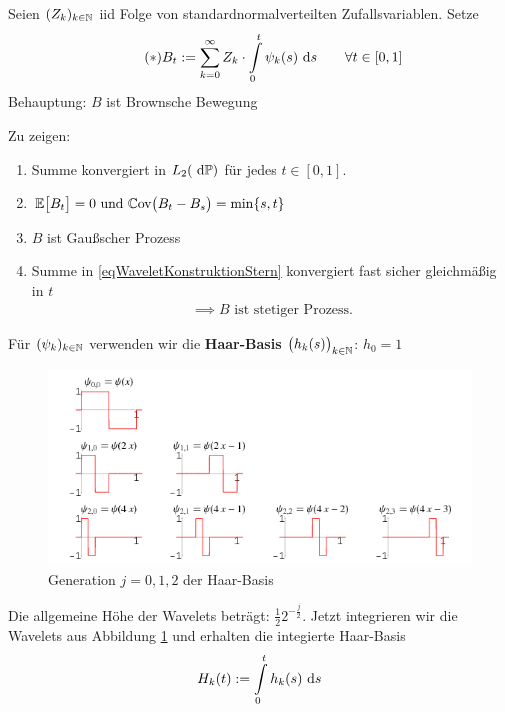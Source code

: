 \begin{theorem}\label{theorem10.2}
	Seien $(Z_k)_{k\in\mathbb{N}}$ iid Folge von standardnormalverteilten Zufallsvariablen. Setze
	\begin{align}\label{eqWaveletKonstruktionStern}\tag{$\ast$}
		B_t:=\sum\limits_{k=0}^\infty Z_k\cdot\int\limits_0^t\psi_k(s)\text{ d} s\qquad\forall t\in[0,1]
	\end{align}
	Behauptung: $B$ ist Brownsche Bewegung
\end{theorem}

Zu zeigen:
\begin{enumerate}[label=\alph*)]
	\item Summe konvergiert in $L_2(\text{ d}\mathbb{P})$ für jedes $t\in[0,1]$.
	\item $\begin{aligned}
		\mathbb{E}\big[B_t\big]=0\text{ und }\mathbb{C}\text{ov}\big(B_t-B_s\big)=\min\lbrace s,t\rbrace
	\end{aligned}$
	\item $B$ ist Gaußscher Prozess
	\item Summe in \eqref{eqWaveletKonstruktionStern} konvergiert fast sicher gleichmäßig in $t$
	\begin{align*}
		\implies B\text{ ist stetiger Prozess.}
	\end{align*}
\end{enumerate}

Für $(\psi_k)_{k\in\mathbb{N}}$ verwenden wir die \textbf{Haar-Basis} $\big(h_k(s)\big)_{k\in\mathbb{N}}$: $h_0 = 1$

\begin{figure}[H]
	\begin{center}
		\includegraphics[width=1\textwidth]{./pics/Haar.png}
		\caption{Generation $j=0,1,2$ der Haar-Basis}
		\label{AbbHaarBasis}
	\end{center}
\end{figure}
Die allgemeine Höhe der Wavelets beträgt: $\frac{1}{2}2^{-\frac{j}{2}}$.
Jetzt integrieren wir die Wavelets aus Abbildung \ref{AbbHaarBasis} und erhalten die integierte Haar-Basis
\begin{align*}
	H_k(t):=\int\limits_0^t h_k(s)\text{ d} s
\end{align*}

